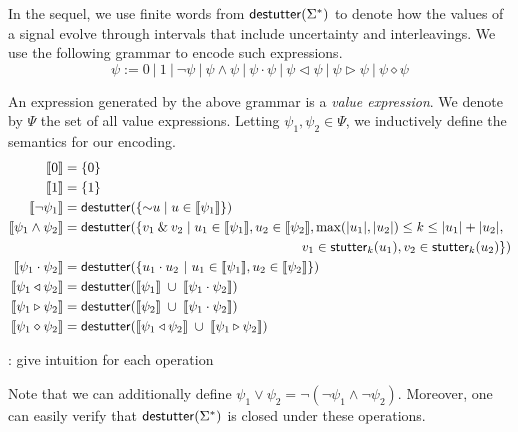 In the sequel, we use finite words from $\mathsf{destutter}(\Sigma^*)$ to denote how the values of a signal evolve through intervals that include uncertainty and interleavings.
We use the following grammar to encode such expressions.
$$ \psi := 0 ~|~ 1 ~|~ \lnot \psi ~|~ \psi \land \psi  ~|~ \psi \cdot \psi ~|~ \psi \triangleleft \psi ~|~ \psi \triangleright \psi ~|~ \psi \diamond \psi $$

An expression generated by the above grammar is a \emph{value expression}.
We denote by $\Psi$ the set of all value expressions.
Letting $\psi_1, \psi_2 \in \Psi$, we inductively define the semantics for our encoding.
\begin{align*}
		\llbracket 0 \rrbracket &=  \{ 0 \} \\
		\llbracket 1 \rrbracket &=  \{ 1 \} \\
		\llbracket \lnot \psi_1 \rrbracket &= \destutter(\{ \BitNeg u \st u \in \llbracket \psi_1 \rrbracket \}) \\
		\llbracket \psi_1 \land \psi_2 \rrbracket &= \destutter(\{ v_1 \BitAnd v_2 \st u_1 \in \llbracket \psi_1 \rrbracket, u_2 \in \llbracket \psi_2 \rrbracket, \max(|u_1|, |u_2|) \leq k \leq |u_1| + |u_2|, \\ 
		& \hspace{18em} v_1 \in \stutter_k(u_1), v_2 \in \stutter_k(u_2) \}) \\
		\llbracket \psi_1 \cdot \psi_2 \rrbracket &= \destutter(\{ u_1 \cdot u_2~|~u_1 \in \llbracket \psi_1 \rrbracket, u_2 \in \llbracket \psi_2 \rrbracket \}) \\
		\llbracket \psi_1 \triangleleft \psi_2 \rrbracket &= \destutter(\llbracket \psi_1 \rrbracket \; \cup \;  \llbracket \psi_1 \cdot \psi_2 \rrbracket) \\
		\llbracket \psi_1 \triangleright \psi_2 \rrbracket &= \destutter(\llbracket \psi_2 \rrbracket \; \cup \;  \llbracket \psi_1 \cdot \psi_2 \rrbracket) \\
		\llbracket \psi_1 \diamond \psi_2 \rrbracket &= \destutter(\llbracket \psi_1 \triangleleft \psi_2 \rrbracket \; \cup \; \llbracket \psi_1 \triangleright \psi_2 \rrbracket)\\
\end{align*}

\TODO: give intuition for each operation

Note that we can additionally define $\psi_1 \lor \psi_2 = \lnot (\lnot \psi_1 \land \lnot \psi_2)$.
Moreover, one can easily verify that $\mathsf{destutter}(\Sigma^*)$ is closed under these operations.

